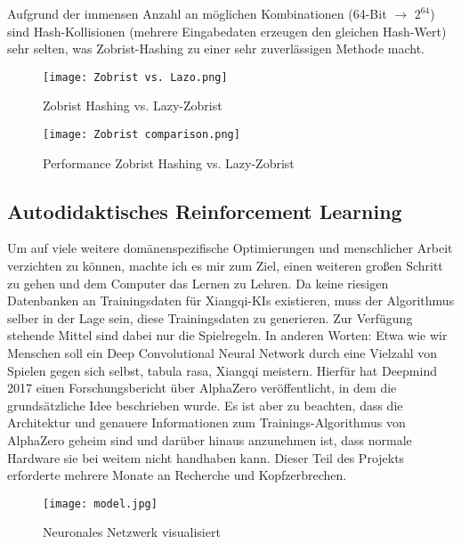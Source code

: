 \documentclass{jpp}
\begin{document}
Aufgrund der immensen Anzahl an möglichen Kombinationen (64-Bit $\rightarrow$ $2^{64}$) sind Hash-Kollisionen (mehrere Eingabedaten erzeugen den gleichen Hash-Wert) sehr selten, was Zobrist-Hashing zu einer sehr zuverlässigen Methode macht.

\begin{figure}
  \centering
  \begin{minipage}{0.49\textwidth}
    \texttt{[image: Zobrist vs. Lazo.png]}
    \caption{Zobrist Hashing vs. Lazy-Zobrist}
    \label{fig:method}
  \end{minipage}
  \hfill
  \begin{minipage}{0.49\textwidth}
    \texttt{[image: Zobrist comparison.png]}
    \caption{Performance Zobrist Hashing vs. Lazy-Zobrist}
    \label{fig:zobrist_perf}
  \end{minipage}
\end{figure}

\subsection{Autodidaktisches Reinforcement Learning}
Um auf viele weitere domänenspezifische Optimierungen und menschlicher Arbeit verzichten zu können, machte ich es mir zum Ziel, einen weiteren großen Schritt zu gehen und dem Computer das Lernen zu Lehren. Da keine riesigen Datenbanken an Trainingsdaten für Xiangqi-KIs existieren, muss der Algorithmus selber in der Lage sein, diese Trainingsdaten zu generieren. Zur Verfügung stehende Mittel sind dabei nur die Spielregeln. In anderen Worten: Etwa wie wir Menschen soll ein Deep Convolutional Neural Network durch eine Vielzahl von Spielen gegen sich selbst, tabula rasa, Xiangqi meistern. Hierfür hat Deepmind 2017 einen Forschungsbericht über AlphaZero veröffentlicht, in dem die grundsätzliche Idee beschrieben wurde. Es ist aber zu beachten, dass die Architektur und genauere Informationen zum Trainings-Algorithmus von AlphaZero geheim sind und darüber hinaus anzunehmen ist, dass normale Hardware sie bei weitem nicht handhaben kann. Dieser Teil des Projekts erforderte mehrere Monate an Recherche und Kopfzerbrechen.

\begin{figure}
\centering
\texttt{[image: model.jpg]}
\caption{Neuronales Netzwerk visualisiert}
\label{fig:model}
\end{figure}
\end{document}
